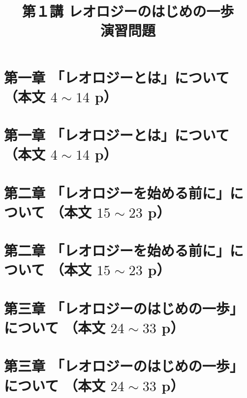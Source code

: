 \documentclass[uplatex,dvipdfmx,a4paper,11pt]{jsreport}
\title{第１講 レオロジーのはじめの一歩\\演習問題}
\author{}
\date{}
\begin{document}
\maketitle

\section*{第一章 「レオロジーとは」について （本文 $4\sim14$ p）}

\clearpage
\section*{第一章 「レオロジーとは」について （本文 $4\sim14$ p）}


\clearpage
\section*{第二章 「レオロジーを始める前に」について （本文 $15\sim23$ p）}

\clearpage
\section*{第二章 「レオロジーを始める前に」について （本文 $15\sim23$ p）}


\clearpage
\section*{第三章 「レオロジーのはじめの一歩」について （本文 $24\sim33$ p）}

\clearpage
\section*{第三章 「レオロジーのはじめの一歩」について （本文 $24\sim33$ p）}

\end{document}

